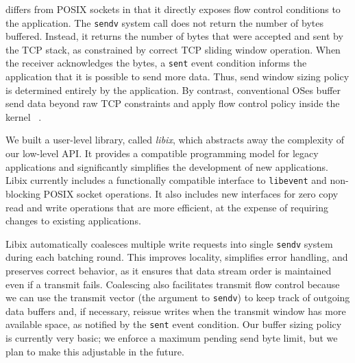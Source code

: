 \ix differs from POSIX sockets in that it directly exposes flow
control conditions to the application. The \texttt{sendv} system call
does not return the number of bytes buffered. Instead, it returns the
number of bytes that were accepted and sent by the TCP stack, as
constrained by correct TCP sliding window operation. When the receiver
acknowledges the bytes, a \texttt{sent} event condition informs the
application that it is possible to send more data. Thus, send window
sizing policy is determined entirely by the application.  By contrast,
conventional OSes buffer send data beyond raw TCP constraints and
apply flow control policy inside the kernel ~\cite{dynamicwindow}.


We built a user-level library, called \emph{libix}, which abstracts
away the complexity of our low-level API. It provides a compatible
programming model for legacy applications and significantly simplifies
the development of new applications. Libix currently includes a
functionally compatible interface to \texttt{libevent} and
non-blocking POSIX socket operations. It also includes new interfaces
for zero copy read and write operations that are more efficient, at
the expense of requiring changes to existing applications.

Libix automatically coalesces multiple write requests into single
\texttt{sendv} system during each batching round. This improves
locality, simplifies error handling, and preserves correct behavior,
as it ensures that data stream order is maintained even if a transmit fails.
Coalescing also facilitates transmit flow control because
we can use the transmit vector (the argument to \texttt{sendv})
to keep track of outgoing data buffers and, if necessary, reissue
writes when the transmit window has more available space, as notified
by the \texttt{sent} event condition. Our buffer sizing policy is currently
very basic; we enforce a maximum pending send byte limit, but
we plan to make this adjustable in the future.


